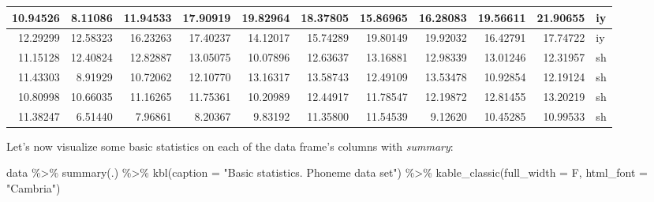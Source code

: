 \documentclass[
]{article}
\newenvironment{Shaded}{\begin{snugshade}}{\end{snugshade}}
\newcommand{\AttributeTok}[1]{\textcolor[rgb]{0.77,0.63,0.00}{#1}}
\newcommand{\FunctionTok}[1]{\textcolor[rgb]{0.00,0.00,0.00}{#1}}
\newcommand{\NormalTok}[1]{#1}
\newcommand{\SpecialCharTok}[1]{\textcolor[rgb]{0.00,0.00,0.00}{#1}}
\newcommand{\StringTok}[1]{\textcolor[rgb]{0.31,0.60,0.02}{#1}}
\begin{document}
\begin{table}
\begin{tabular}[t]{r|r|r|r|r|r|r|r|r|r|l}
\hline
10.94526 & 8.11086 & 11.94533 & 17.90919 & 19.82964 & 18.37805 & 15.86965 & 16.28083 & 19.56611 & 21.90655 & iy\\
\hline
12.29299 & 12.58323 & 16.23263 & 17.40237 & 14.12017 & 15.74289 & 19.80149 & 19.92032 & 16.42791 & 17.74722 & iy\\
\hline
11.15128 & 12.40824 & 12.82887 & 13.05075 & 10.07896 & 12.63637 & 13.16881 & 12.98339 & 13.01246 & 12.31957 & sh\\
\hline
11.43303 & 8.91929 & 10.72062 & 12.10770 & 13.16317 & 13.58743 & 12.49109 & 13.53478 & 10.92854 & 12.19124 & sh\\
\hline
10.80998 & 10.66035 & 11.16265 & 11.75361 & 10.20989 & 12.44917 & 11.78547 & 12.19872 & 12.81455 & 13.20219 & sh\\
\hline
11.38247 & 6.51440 & 7.96861 & 8.20367 & 9.83192 & 11.35800 & 11.54539 & 9.12620 & 10.45285 & 10.99533 & sh\\
\hline
\end{tabular}
\end{table}

Let's now visualize some basic statistics on each of the data frame's
columns with \emph{summary}:

\begin{Shaded}
\begin{Highlighting}[]
\NormalTok{data }\SpecialCharTok{\%\textgreater{}\%} 
  \FunctionTok{summary}\NormalTok{(.) }\SpecialCharTok{\%\textgreater{}\%} 
  \FunctionTok{kbl}\NormalTok{(}\AttributeTok{caption =} \StringTok{"Basic statistics. Phoneme data set"}\NormalTok{) }\SpecialCharTok{\%\textgreater{}\%}
  \FunctionTok{kable\_classic}\NormalTok{(}\AttributeTok{full\_width =}\NormalTok{ F, }\AttributeTok{html\_font =} \StringTok{"Cambria"}\NormalTok{)}
\end{Highlighting}
\end{Shaded}
\end{document}
